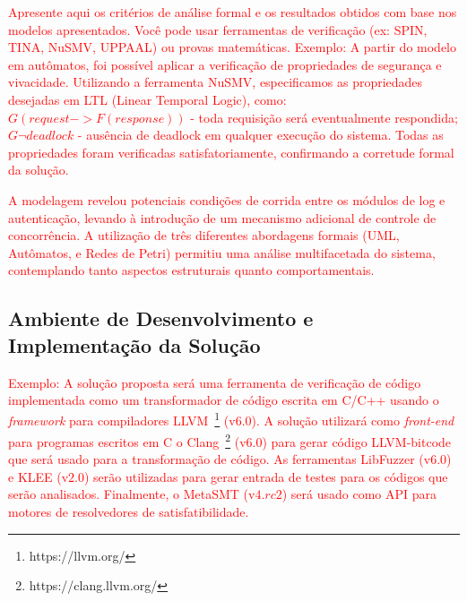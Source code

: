 \textcolor{red}{Apresente aqui os critérios de análise formal e os resultados obtidos com base nos modelos apresentados. Você pode usar ferramentas de verificação (ex: SPIN, TINA, NuSMV, UPPAAL) ou provas matemáticas.
%
Exemplo: A partir do modelo em autômatos, foi possível aplicar a verificação de propriedades de segurança e vivacidade.
Utilizando a ferramenta NuSMV, especificamos as propriedades desejadas em LTL (Linear Temporal Logic), como: $G(request -> F(response))$ - toda requisição será eventualmente respondida; $G \neg deadlock$ - ausência de deadlock em qualquer execução do sistema.
Todas as propriedades foram verificadas satisfatoriamente, confirmando a corretude formal da solução.}

\textcolor{red}{A modelagem revelou potenciais condições de corrida entre os módulos de log e autenticação, levando à introdução de um mecanismo adicional de controle de concorrência.
A utilização de três diferentes abordagens formais (UML, Autômatos, e Redes de Petri) permitiu uma análise multifacetada do sistema, contemplando tanto aspectos estruturais quanto comportamentais.}


\subsection{Ambiente de Desenvolvimento e Implementação da Solução}


\textcolor{red}{Exemplo: A solução proposta será uma ferramenta de verificação de código implementada como um transformador de código escrita em C/C++ usando o \textit{framework} para compiladores LLVM~\footnote{https://llvm.org/} (v$6.0$). A solução utilizará como \textit{front-end} para programas escritos em C o Clang~\footnote{https://clang.llvm.org/} (v$6.0$) para gerar código LLVM-bitcode que será usado para a transformação de código. As ferramentas LibFuzzer (v$6.0$) e KLEE (v$2.0$) serão utilizadas para gerar entrada de testes para os códigos que serão analisados. Finalmente, o MetaSMT (v$4.rc2$) será usado como API para motores de resolvedores de satisfatibilidade.}


